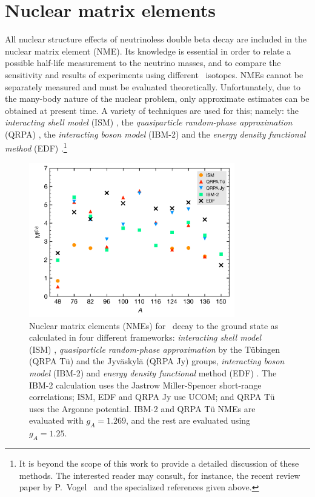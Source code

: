 \documentclass{PoS}
\begin{document}
\section{Nuclear matrix elements} \label{sec:NME}
All nuclear structure effects of neutrinoless double beta decay are included in the nuclear matrix element (NME). Its knowledge is essential in order to relate a possible half-life measurement to the neutrino masses, and to compare the sensitivity and results of experiments using different \bb\ isotopes. NMEs cannot be separately measured and must be evaluated theoretically. Unfortunately, due to the many-body nature of the nuclear problem, only approximate estimates can be obtained at present time. A variety of techniques are used for this; namely: the \emph{interacting shell model} (ISM) \cite{Caurier:2007wq, Menendez:2008jp}, the \emph{quasiparticle random-phase approximation} (QRPA) \cite{Rodin:2006yk, Kortelainen:2007rn}, the \emph{interacting boson model} (IBM-2) \cite{Barea:2013bz} and the \emph{energy density functional method} (EDF) \cite{Rodriguez:2010mn, Vaquero:2014dna}.\footnote{It is beyond the scope of this work to provide a detailed discussion of these methods. The interested reader may consult, for instance, the recent review paper by P.~Vogel~\cite{Vogel:2012ja} and the specialized references given above.}

\begin{figure}
\centering
\includegraphics[width=0.8\textwidth]{img/NME.pdf}
\caption{Nuclear matrix elements (NMEs) for \bbonu\ decay to the ground state as calculated in four different frameworks: \emph{interacting shell model} (ISM) \cite{Menendez:2008jp}, \emph{quasiparticle random-phase approximation} by the T\"ubingen (QRPA T\"u) \cite{Simkovic:2013qiy} and the Jyv\"askyl\"a (QRPA Jy) \cite{Suhonen:2012ii} groups, \emph{interacting boson model} (IBM-2) \cite{Barea:2013bz} and \emph{energy density functional} method (EDF) \cite{Vaquero:2014dna}. 
The IBM-2 calculation uses the Jastrow Miller-Spencer short-range correlations; ISM, EDF and QRPA Jy use UCOM; and QRPA T\"u uses the Argonne potential. 
IBM-2 and QRPA T\"u NMEs are evaluated with $g_{A}=1.269$, and the rest are evaluated using $g_{A}=1.25$.}\label{fig:NME}
\end{figure}
\end{document}
